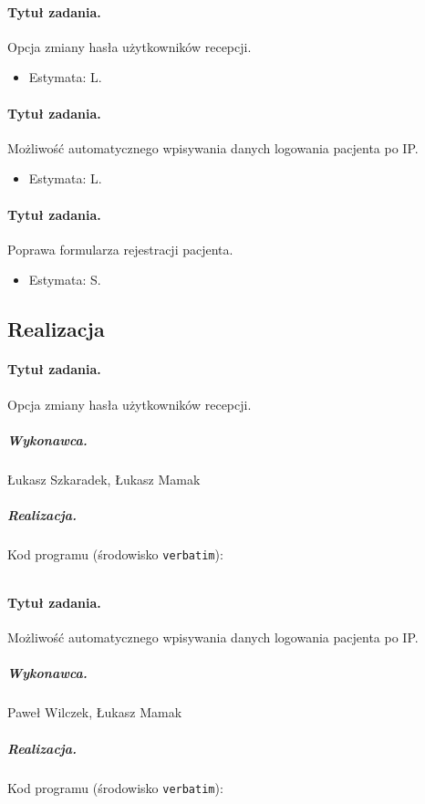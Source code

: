 \documentclass[a4paper]{article} \usepackage{polski} \usepackage[cp1250]{inputenc} \usepackage{url}
\begin{document}
\paragraph{Tytuł zadania.} Opcja zmiany hasła użytkowników recepcji. \begin{itemize} \item Estymata: L. \end{itemize}

\paragraph{Tytuł zadania.} Możliwość automatycznego wpisywania danych logowania pacjenta po IP. \begin{itemize} \item Estymata: L. \end{itemize}

\paragraph{Tytuł zadania.} Poprawa formularza rejestracji pacjenta.  \begin{itemize} \item Estymata: S. \end{itemize}



\subsection{Realizacja}
\label{Realizacja4}
\paragraph{Tytuł zadania.}  Opcja zmiany hasła użytkowników recepcji. \subparagraph{Wykonawca.} Łukasz Szkaradek, Łukasz Mamak \subparagraph{Realizacja.}  
\newline
\newline
Kod programu (środowisko \texttt{verbatim}): \begin{verbatim} \end{verbatim}

\paragraph{Tytuł zadania.}  Możliwość automatycznego wpisywania danych logowania pacjenta po IP. \subparagraph{Wykonawca.} Paweł Wilczek, Łukasz Mamak \subparagraph{Realizacja.}  
\newline
\newline
Kod programu (środowisko \texttt{verbatim}): \begin{verbatim} \end{verbatim}
\end{document}
